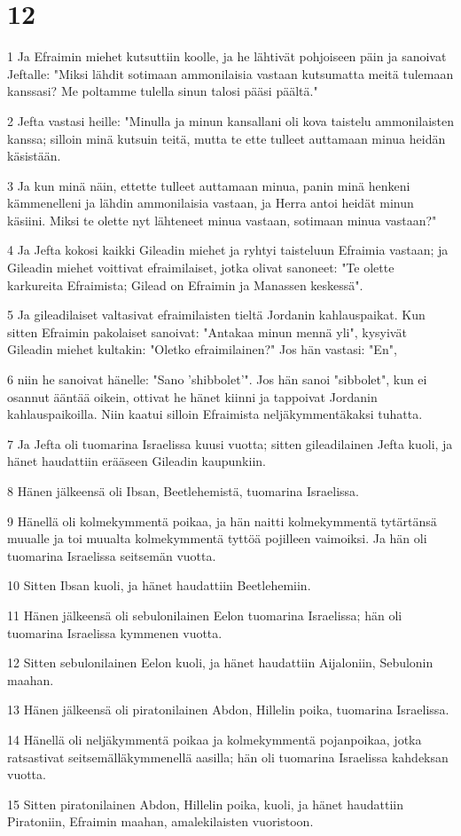 \chapter{12}

\par 1 Ja Efraimin miehet kutsuttiin koolle, ja he lähtivät pohjoiseen päin ja sanoivat Jeftalle: "Miksi lähdit sotimaan ammonilaisia vastaan kutsumatta meitä tulemaan kanssasi? Me poltamme tulella sinun talosi pääsi päältä."
\par 2 Jefta vastasi heille: "Minulla ja minun kansallani oli kova taistelu ammonilaisten kanssa; silloin minä kutsuin teitä, mutta te ette tulleet auttamaan minua heidän käsistään.
\par 3 Ja kun minä näin, ettette tulleet auttamaan minua, panin minä henkeni kämmenelleni ja lähdin ammonilaisia vastaan, ja Herra antoi heidät minun käsiini. Miksi te olette nyt lähteneet minua vastaan, sotimaan minua vastaan?"
\par 4 Ja Jefta kokosi kaikki Gileadin miehet ja ryhtyi taisteluun Efraimia vastaan; ja Gileadin miehet voittivat efraimilaiset, jotka olivat sanoneet: "Te olette karkureita Efraimista; Gilead on Efraimin ja Manassen keskessä".
\par 5 Ja gileadilaiset valtasivat efraimilaisten tieltä Jordanin kahlauspaikat. Kun sitten Efraimin pakolaiset sanoivat: "Antakaa minun mennä yli", kysyivät Gileadin miehet kultakin: "Oletko efraimilainen?" Jos hän vastasi: "En",
\par 6 niin he sanoivat hänelle: "Sano 'shibbolet'". Jos hän sanoi "sibbolet", kun ei osannut ääntää oikein, ottivat he hänet kiinni ja tappoivat Jordanin kahlauspaikoilla. Niin kaatui silloin Efraimista neljäkymmentäkaksi tuhatta.
\par 7 Ja Jefta oli tuomarina Israelissa kuusi vuotta; sitten gileadilainen Jefta kuoli, ja hänet haudattiin erääseen Gileadin kaupunkiin.
\par 8 Hänen jälkeensä oli Ibsan, Beetlehemistä, tuomarina Israelissa.
\par 9 Hänellä oli kolmekymmentä poikaa, ja hän naitti kolmekymmentä tytärtänsä muualle ja toi muualta kolmekymmentä tyttöä pojilleen vaimoiksi. Ja hän oli tuomarina Israelissa seitsemän vuotta.
\par 10 Sitten Ibsan kuoli, ja hänet haudattiin Beetlehemiin.
\par 11 Hänen jälkeensä oli sebulonilainen Eelon tuomarina Israelissa; hän oli tuomarina Israelissa kymmenen vuotta.
\par 12 Sitten sebulonilainen Eelon kuoli, ja hänet haudattiin Aijaloniin, Sebulonin maahan.
\par 13 Hänen jälkeensä oli piratonilainen Abdon, Hillelin poika, tuomarina Israelissa.
\par 14 Hänellä oli neljäkymmentä poikaa ja kolmekymmentä pojanpoikaa, jotka ratsastivat seitsemälläkymmenellä aasilla; hän oli tuomarina Israelissa kahdeksan vuotta.
\par 15 Sitten piratonilainen Abdon, Hillelin poika, kuoli, ja hänet haudattiin Piratoniin, Efraimin maahan, amalekilaisten vuoristoon.

